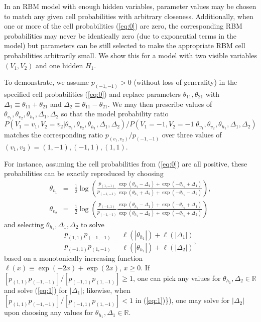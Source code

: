 \documentclass[12pt]{article}
\theoremstyle{definition}
\begin{document}
In an RBM model with enough hidden variables, parameter values may be
chosen to match any given cell probabilities with arbitrary closeness.
Additionally, when one or more of the cell probabilities (\eqref{eq:0})
are zero, the corresponding RBM probabilities may never be identically
zero (due to exponential terms in the model) but parameters can be still
selected to make the appropriate RBM cell probabilities arbitrarily
small. We show this for a model with two visible variables \((V_1,V_2)\)
and one hidden \(H_1\).

To demonstrate, we assume \(p_{(-1,-1)}>0\) (without loss of generality)
in the specified cell probabilities (\eqref{eq:0}) and replace parameters
\(\theta_{11},\theta_{21}\) with
\(\Delta_1 \equiv \theta_{11} +\theta_{21}\) and
\(\Delta_2 \equiv \theta_{11} -\theta_{21}\). We may then prescribe
values of
\(\theta_{v_1}, \theta_{v_2}, \theta_{h_1}, \Delta_1,\Delta_2\) so that
the model probability ratio \[
P(V_1=v_1,V_2=v_2|\theta_{v_1}, \theta_{v_2}, \theta_{h_1}, \Delta_1,\Delta_2)/  P(V_1=-1,V_2=-1| \theta_{v_1}, \theta_{v_2}, \theta_{h_1}, \Delta_1,\Delta_2)
\] matches the corresponding ratio \(p_{(v_1,v_2)}/p_{(-1,-1)}\) over
three values of \((v_1,v_2) = (1,-1),(-1,1),(1,1)\).

For instance, assuming the cell probabilities from (\eqref{eq:0}) are all
positive, these probabilities can be exactly reproduced by choosing
\begin{eqnarray*}
\theta_{v_1} &=& \frac{1}{2} \log\left( \frac{p_{(1,-1)}}{p_{(-1,-1)}} \frac{\exp(\theta_{h_1}-\Delta_1) + \exp(-\theta_{h_1}+\Delta_1)}{\exp(\theta_{h_1}+\Delta_2) + \exp(-\theta_{h_1}-\Delta_2)}  \right),\\ 
\theta_{v_2}&= &\frac{1}{2} \log\left( \frac{p_{(-1,1)}}{p_{(-1,-1)}} \frac{\exp(\theta_{h_1}-\Delta_1) + \exp(-\theta_{h_1}+\Delta_1)}{\exp(\theta_{h_1}-\Delta_2) + \exp(-\theta_{h_1}+\Delta_2)}  \right)
\end{eqnarray*}
and selecting \(\theta_{h_1}, \Delta_1,\Delta_2\) to solve
\begin{equation}
\label{eq:1}
\frac{p_{(1,1)}p_{(-1,-1)}}{p_{(-1,1)}p_{(1,-1)}} = \frac{\ell(|\theta_{h_1}|) + \ell(|\Delta_1|) }{\ell(|\theta_{h_1}|) + \ell(|\Delta_2|)},
\end{equation}
based on a monotonically increasing function
\(\ell(x)\equiv \exp(-2x)+\exp(2x)\), \(x \geq 0\). If
\([p_{(1,1)}p_{(-1,-1)}]/ [p_{(-1,1)}p_{(1,-1)}] \geq 1\), one can pick
any values for \(\theta_{h_1}, \Delta_2\in \mathbb{R}\) and solve
(\eqref{eq:1}) for \(|\Delta_1|\); likewise, when
\([p_{(1,1)}p_{(-1,-1)}]/ [p_{(-1,1)}p_{(1,-1)}] < 1\) in
(\eqref{eq:1})\}), one may solve for \(|\Delta_2|\) upon choosing any
values for \(\theta_{h_1}, \Delta_1\in \mathbb{R}\).
\end{document}
